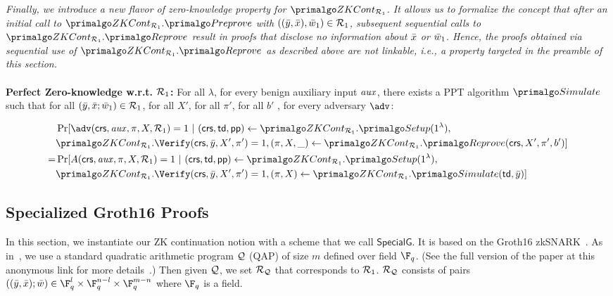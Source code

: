 \begin{definition}[ZK Continuation]
 \emph{Finally, we introduce a new flavor of zero-knowledge property for $ \ZKCont_{\relone} $. It allows us to formalize the concept that after an initial call to $\ZKCont_{\relone}.\Preprove$ with $((\bar{y}, \bar{x}), \bar{w}_1) \in \mathcal{R}_1$, subsequent sequential calls to $ \ZKCont_{\relone}.\Reprove $ result in proofs that disclose no information about $\bar{x}$ or $\bar{w}_1$.
Hence, the proofs obtained via sequential use of $ \ZKCont_{\relone}.\Reprove $ as described above are not linkable, i.e., a property targeted  in the preamble of this section. }
\\\\
\noindent \textbf{Perfect Zero-knowledge w.r.t. $\mathcal{R}_1$:} For all $\lambda$, for every benign auxiliary input $\mathit{aux}$, there exists a PPT algorithm $ \Sim $ such that 
for all  $(\bar{y}, \bar{x}; \bar{w}_1) \in \mathcal{R}_1$, for all $X'$, for all $\pi'$, for all $b'$ , for every adversary $\adv$:
\begin{footnotesize}
\begin{align*}
& \Pr [\adv(\crs, \realaux, \pi, X, \relone) = 1 \ | \ (\crs, \tw, \pp) \leftarrow \ZKCont_{\relone}.\Setup (1^{\lambda}), 
\\& \ZKCont_{\relone}.\Verify(\crs, \bary, X', \pi') = 1,  (\pi, X, \_) \leftarrow \ZKCont_{\relone}.\Reprove (\crs, X', \pi', b')] \\
= & \Pr[A(\crs, \realaux, \pi, X, \relone) = 1 \ | \ (\crs, \tw, \pp) \leftarrow \ZKCont_{\relone}.\Setup (1^{\lambda}), \\ 
                        & \ZKCont_{\relone}.\Verify(\crs, \bary, X', \pi') = 1,  (\pi, X) \leftarrow \ZKCont_{\relone}.\Sim(\tw, \bary)]
\end{align*}

\end{footnotesize}


\end{definition} 



\subsection{Specialized Groth16 Proofs}
\label{sec:rvrf_groth16}

In this section, we instantiate our ZK continuation notion with a scheme that we call  \emph{$\mathsf{SpecialG}$}. It is based on the Groth16 zkSNARK~\cite{Groth16}.
As in~\cite{Groth16}, we use a standard quadratic arithmetic program $ \mathcal{Q} $ (QAP) of size $ m $ defined over field $ \F_q $. 
(See the full version of the paper at this anonymous link for more details~\cite{anonymous}.)
Then given $ \mathcal{Q} $, we set  $ \mathcal{R}_{\mathcal{Q}}  $ that corresponds to $ \mathcal{R}_1 $. $ \mathcal{R}_{\mathcal{Q}} $  consists of pairs $((\bary, \barx); \baromega) \in \F_q^{l} \times \F_q^{n-l} \times \F_q^{m-n}$ where $\F_q$ is a field.  

